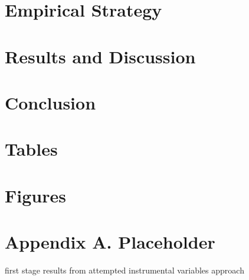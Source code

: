 \documentclass[12pt]{article}
\begin{document}
\section{Empirical Strategy} \label{sec:empirical_strategy}

\section{Results and Discussion} \label{sec:result}

\section{Conclusion} \label{sec:conclusion}



\singlespacing
\setlength\bibsep{0pt}





\clearpage

\onehalfspacing

\section*{Tables} \label{sec:tab}






\clearpage

\section*{Figures} \label{sec:fig}



\clearpage

\section*{Appendix A. Placeholder} \label{sec:appendixa}
first stage results from attempted instrumental variables approach
\end{document}
